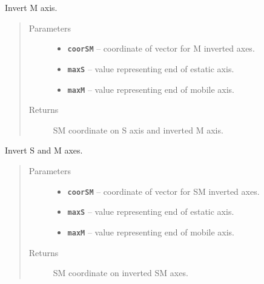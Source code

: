 \documentclass[letterpaper,10pt,english]{sphinxmanual}
\begin{document}

\begin{fulllineitems}
\label{RRtoolbox.lib.arrayops:RRtoolbox.lib.arrayops.basic.invertM}
Invert M axis.
\begin{quote}\begin{description}
\item[{Parameters}] \leavevmode\begin{itemize}
\item {} 
\textbf{\texttt{coorSM}} -- coordinate of vector for M inverted axes.

\item {} 
\textbf{\texttt{maxS}} -- value representing end of estatic axis.

\item {} 
\textbf{\texttt{maxM}} -- value representing end of mobile axis.

\end{itemize}

\item[{Returns}] \leavevmode
SM coordinate on S axis and inverted M axis.

\end{description}\end{quote}

\end{fulllineitems}


\begin{fulllineitems}
\label{RRtoolbox.lib.arrayops:RRtoolbox.lib.arrayops.basic.invertSM}
Invert S and M axes.
\begin{quote}\begin{description}
\item[{Parameters}] \leavevmode\begin{itemize}
\item {} 
\textbf{\texttt{coorSM}} -- coordinate of vector for SM inverted axes.

\item {} 
\textbf{\texttt{maxS}} -- value representing end of estatic axis.

\item {} 
\textbf{\texttt{maxM}} -- value representing end of mobile axis.

\end{itemize}

\item[{Returns}] \leavevmode
SM coordinate on inverted SM axes.

\end{description}\end{quote}

\end{fulllineitems}
\end{document}
